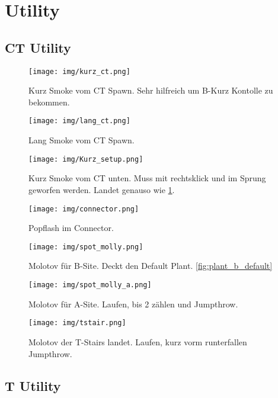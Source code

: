 \section{Utility}
\subsection{CT Utility}

\begin{figure}
    \centering
    \texttt{[image: img/kurz\_ct.png]}
    \caption{Kurz Smoke vom CT Spawn. Sehr hilfreich um B-Kurz Kontolle zu bekommen.}
    \label{fig:kurz_smoke_ct}
\end{figure}
\begin{figure}
    \centering
    \texttt{[image: img/lang\_ct.png]}
    \caption{Lang Smoke vom CT Spawn.}
    \label{fig:lang_smoke_ct}
\end{figure}
\begin{figure}
    \centering
    \texttt{[image: img/Kurz\_setup.png]}
    \caption{Kurz Smoke vom CT unten. Muss mit rechtsklick und im Sprung geworfen werden. Landet genauso wie \ref{fig:kurz_smoke_ct}.}
    \label{fig:kurz_smoke}
\end{figure}
\begin{figure}
    \centering
    \texttt{[image: img/connector.png]}
    \caption{Popflash im Connector.}
    \label{fig:connector_flash}
\end{figure}
\begin{figure}
    \centering
    \texttt{[image: img/spot\_molly.png]}
    \caption{Molotov für B-Site. Deckt den Default Plant. \ref{fig:plant_b_default}}
    \label{fig:spot_moly}
\end{figure}
\begin{figure}
    \centering
    \texttt{[image: img/spot\_molly\_a.png]}
    \caption{Molotov für A-Site. Laufen, bis 2 zählen und Jumpthrow.}
    \label{fig:spot_molly_a}
\end{figure}
\begin{figure}
    \centering
    \texttt{[image: img/tstair.png]}
    \caption{Molotov der T-Stairs landet. Laufen, kurz vorm runterfallen Jumpthrow.}
    \label{fig:tstair}
\end{figure}
\FloatBarrier
\subsection{T Utility}
